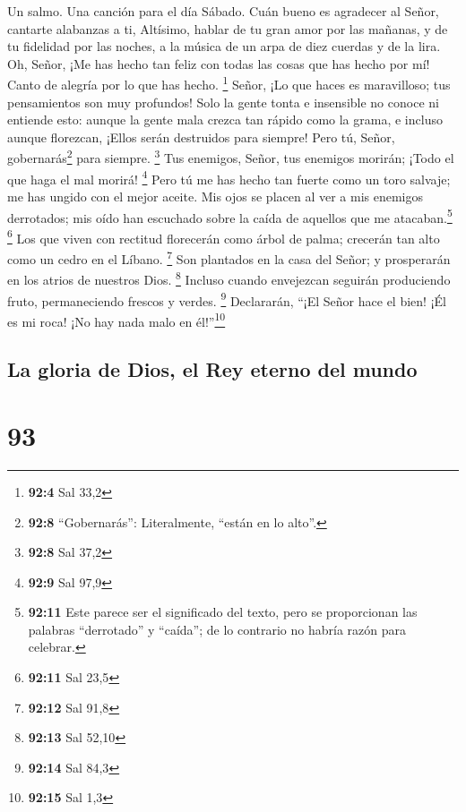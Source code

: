 Un salmo. Una canción para el día Sábado.  Cuán bueno es
agradecer al Señor, cantarte alabanzas a ti, Altísimo, 
hablar de tu gran amor por las mañanas, y de tu fidelidad por las
noches,  a la música de un arpa de diez cuerdas y de la
lira.  Oh, Señor, ¡Me has hecho tan feliz con todas las
cosas que has hecho por mí! Canto de alegría por lo que has hecho.
\footnote{\textbf{92:4} Sal 33,2}  Señor, ¡Lo que haces es
maravilloso; tus pensamientos son muy profundos!  Solo la
gente tonta e insensible no conoce ni entiende esto: 
aunque la gente mala crezca tan rápido como la grama, e incluso aunque
florezcan, ¡Ellos serán destruidos para siempre!  Pero tú,
Señor, gobernarás\footnote{\textbf{92:8} ``Gobernarás'': Literalmente,
  ``están en lo alto''.} para siempre. \footnote{\textbf{92:8} Sal 37,2}
 Tus enemigos, Señor, tus enemigos morirán; ¡Todo el que
haga el mal morirá! \footnote{\textbf{92:9} Sal 97,9} 
Pero tú me has hecho tan fuerte como un toro salvaje; me has ungido con
el mejor aceite.  Mis ojos se placen al ver a mis
enemigos derrotados; mis oído han escuchado sobre la caída de aquellos
que me atacaban.\footnote{\textbf{92:11} Este parece ser el significado
  del texto, pero se proporcionan las palabras ``derrotado'' y
  ``caída''; de lo contrario no habría razón para celebrar.} \footnote{\textbf{92:11}
  Sal 23,5}  Los que viven con rectitud florecerán como
árbol de palma; crecerán tan alto como un cedro en el Líbano.
\footnote{\textbf{92:12} Sal 91,8}  Son plantados en la
casa del Señor; y prosperarán en los atrios de nuestros Dios.
\footnote{\textbf{92:13} Sal 52,10}  Incluso cuando
envejezcan seguirán produciendo fruto, permaneciendo frescos y verdes.
\footnote{\textbf{92:14} Sal 84,3}  Declararán, ``¡El
Señor hace el bien! ¡Él es mi roca! ¡No hay nada malo en
él!''\footnote{\textbf{92:15} Sal 1,3}

\hypertarget{la-gloria-de-dios-el-rey-eterno-del-mundo}{%
\subsection{La gloria de Dios, el Rey eterno del
mundo}\label{la-gloria-de-dios-el-rey-eterno-del-mundo}}

\hypertarget{section-92}{%
\section{93}\label{section-92}}

